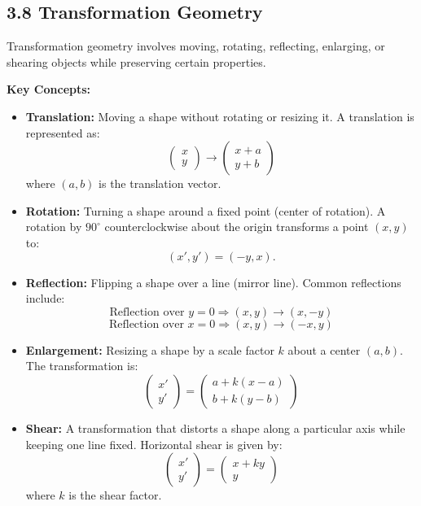 
\subsection*{3.8 Transformation Geometry}
Transformation geometry involves moving, rotating, reflecting, enlarging, or shearing objects while preserving certain properties.

\textbf{Key Concepts:}
\begin{itemize}
	\item \textbf{Translation:} Moving a shape without rotating or resizing it. A translation is represented as:
	\[
	\begin{pmatrix} x \\ y \end{pmatrix} \to \begin{pmatrix} x + a \\ y + b \end{pmatrix}
	\]
	where $(a, b)$ is the translation vector.
	
	
	\item \textbf{Rotation:} Turning a shape around a fixed point (center of rotation). A rotation by $90^\circ$ counterclockwise about the origin transforms a point $(x, y)$ to:
	\[
	(x', y') = (-y, x).
	\]
	
	
	
	\item \textbf{Reflection:} Flipping a shape over a line (mirror line). Common reflections include:
	\[
	\text{Reflection over } y = 0 \Rightarrow (x, y) \to (x, -y)
	\]
	\[
	\text{Reflection over } x = 0 \Rightarrow (x, y) \to (-x, y)
	\]
	
	\item \textbf{Enlargement:} Resizing a shape by a scale factor $k$ about a center $(a, b)$. The transformation is:
	\[
	\begin{pmatrix} x' \\ y' \end{pmatrix} =
	\begin{pmatrix} a + k(x - a) \\ b + k(y - b) \end{pmatrix}
	\]
	
	\item \textbf{Shear:} A transformation that distorts a shape along a particular axis while keeping one line fixed. Horizontal shear is given by:
	\[
	\begin{pmatrix} x' \\ y' \end{pmatrix} =
	\begin{pmatrix} x + ky \\ y \end{pmatrix}
	\]
	where $k$ is the shear factor.
\end{itemize}

